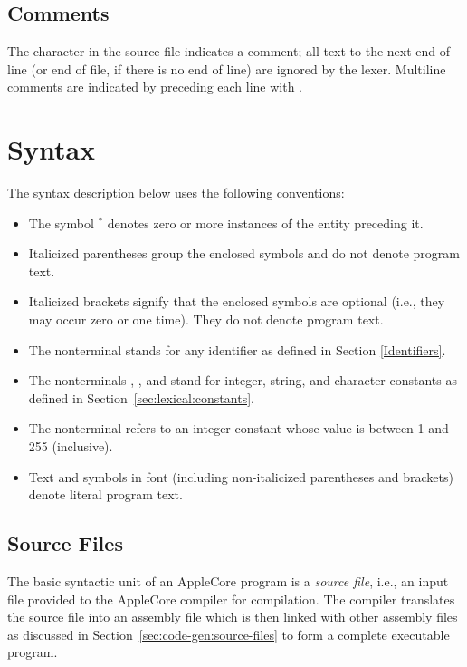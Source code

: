 \documentclass[10pt]{article}
\begin{document}
\subsection{Comments}
\label{sec:lexical:comments}

The character \kwd{\#} in the source file indicates a comment; all
text to the next end of line (or end of file, if there is no end of
line) are ignored by the lexer.  Multiline comments are indicated by
preceding each line with \kwd{\#}.

\section{Syntax}
\label{sec:syntax}

The syntax description below uses the following conventions:
%
\begin{itemize}
%
\item The symbol $^*$ denotes zero or more instances of the entity
  preceding it.
%
\item Italicized parentheses \group{} group the enclosed symbols and
  do not denote program text.
%
\item Italicized brackets \opt{} signify that the enclosed symbols are
  optional (i.e., they may occur zero or one time).  They do not
  denote program text.
%
\item The nonterminal  stands for any identifier
  as defined in Section \ref{Identifiers}.
%
\item The nonterminals ,
  , and  stand for integer,
  string, and character constants as defined in
  Section~\ref{sec:lexical:constants}.
%
\item The nonterminal  refers to an integer constant
  whose value is between 1 and 255 (inclusive).
%
\item Text and symbols in  font (including
  non-italicized parentheses and brackets) denote literal program
  text.
%
\end{itemize}

\subsection{Source Files}
\label{sec:syntax:source-files}

The basic syntactic unit of an AppleCore program is a \emph{source
  file}, i.e., an input file provided to the AppleCore compiler for
compilation.  The compiler translates the source file into an assembly
file which is then linked with other assembly files as discussed in
Section~\ref{sec:code-gen:source-files} to form a complete executable
program.
\end{document}
